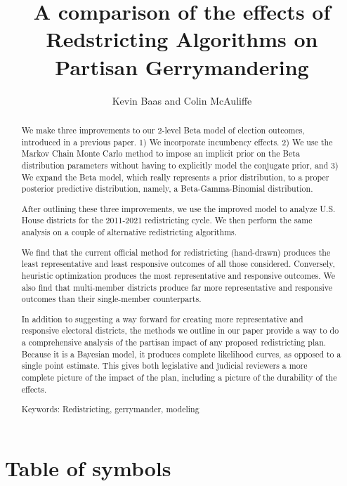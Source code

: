 \documentclass[preprint,12pt]{article}
\begin{document}
\title{A comparison of the effects of Redstricting Algorithms on Partisan Gerrymandering}

\author{Kevin Baas and Colin McAuliffe}

\maketitle

\begin{abstract}
We make three improvements to our 2-level Beta model of election outcomes, introduced in a previous paper.  1) We incorporate incumbency effects. 2) We use the Markov Chain Monte Carlo method to impose an implicit prior on the Beta distribution parameters without having to explicitly model the conjugate prior, and 3) We expand the Beta model, which really represents a prior distribution, to a proper posterior predictive distribution, namely, a Beta-Gamma-Binomial distribution.  

After outlining these three improvements, we use the improved model to analyze U.S. House districts for the 2011-2021 redistricting cycle.  We then perform the same analysis on a couple of alternative redistricting algorithms.

We find that the current official method for redistricting (hand-drawn) produces the least representative and least responsive outcomes of all those considered.  Conversely, heuristic optimization produces the most representative and responsive outcomes.  We also find that multi-member districts produce far more representative and responsive outcomes than their single-member counterparts.

In addition to suggesting a way forward for creating more representative and responsive electoral districts, the methods we outline in our paper provide a way to do a comprehensive analysis of the partisan impact of any proposed redistricting plan.  Because it is a Bayesian model, it produces complete likelihood curves, as opposed to a single point estimate.  This gives both legislative and judicial reviewers a more complete picture of the impact of the plan, including a picture of the durability of the effects.

Keywords: Redistricting, gerrymander, modeling

\end{abstract}

\clearpage

\section{Table of symbols}
\end{document}

